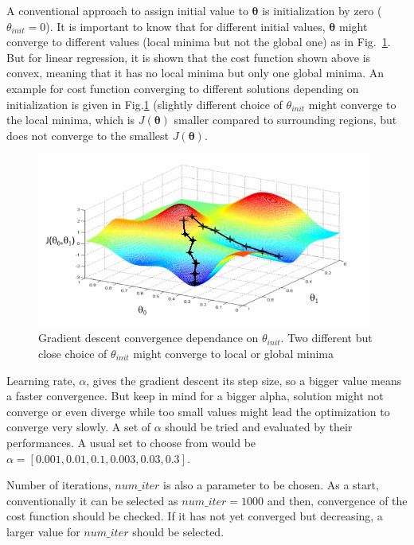 A conventional approach to assign initial value to ${\bm{\theta}}$ is initialization by zero ($\theta_{init} = 0$).
It is important to know that for different initial values, ${\bm{\theta}}$ might converge to different values (local minima but not the global one) as in Fig.~\ref{fig:localOrGlobalMinimaGD}. 
But for linear regression, it is shown that the cost function shown above is convex, meaning that it has no local minima but only one global minima. An example for cost function converging to different solutions depending on initialization is given in Fig.\ref{fig:localOrGlobalMinimaGD} (slightly different choice of $\theta_{init}$ might converge to the local minima, which is $J(\bm{\theta})$ smaller compared to surrounding regions, but does not converge to the smallest $J(\bm{\theta})$.

\begin{figure}
\begin{center}
\includegraphics[width=11cm]{figures/localOrGlobalMinimaGD}    %
\caption{Gradient descent convergence dependance on $\theta_{init}$. Two different but close choice of $\theta_{init}$ might converge to local or global minima \cite{andrewNg_MachLearning}} 
\label{fig:localOrGlobalMinimaGD}
\end{center}
\end{figure}
 
Learning rate,  $\alpha$, gives the gradient descent its step size, so a bigger value means a faster convergence. 
But keep in mind for a bigger alpha, solution might not converge or even diverge while too small values might lead the optimization to converge very slowly.
A set of $\alpha$ should be tried and evaluated by their performances. A usual set to choose from would be $\alpha = [0.001, 0.01, 0.1, 0.003, 0.03, 0.3]$.
  
Number of iterations, $num\_iter$ is also a parameter to be chosen. 
As a start, conventionally it can be selected as $num\_iter = 1000$ and then, convergence of the cost function should be checked. 
If it has not yet converged but decreasing, a larger value for $num\_iter$ should be selected.

